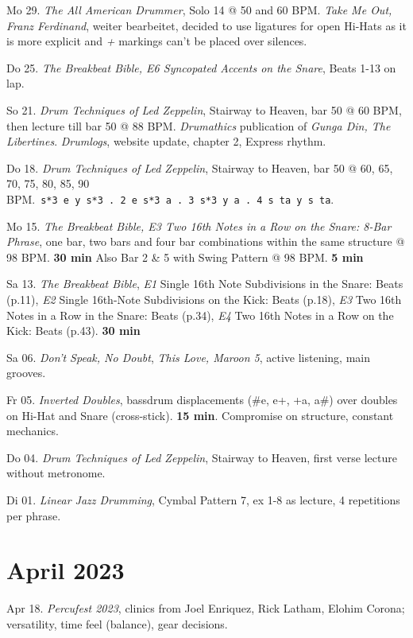 \documentclass[
]{book}
\begin{document}
Mo 29. \emph{The All American Drummer}, Solo 14 @ 50 and 60 BPM. \emph{Take Me Out, Franz Ferdinand}, weiter bearbeitet, decided to use ligatures for open Hi-Hats as it is more explicit and \emph{+} markings can't be placed over silences.

Do 25. \emph{The Breakbeat Bible, E6 Syncopated Accents on the Snare}, Beats 1-13 on lap.

So 21. \emph{Drum Techniques of Led Zeppelin}, Stairway to Heaven, bar 50 @ 60 BPM, then lecture till bar 50 @ 88 BPM. \emph{Drumathics} publication of \emph{Gunga Din, The Libertines}. \emph{Drumlogs}, website update, chapter 2, Express rhythm.

Do 18. \emph{Drum Techniques of Led Zeppelin}, Stairway to Heaven, bar 50 @ 60, 65, 70, 75, 80, 85, 90 BPM.~\texttt{s*3\ e\ y\ s*3\ .\ 2\ e\ s*3\ a\ .\ 3\ s*3\ y\ a\ .\ 4\ s\ ta\ y\ s\ ta}.

Mo 15. \emph{The Breakbeat Bible, E3 Two 16th Notes in a Row on the Snare: 8-Bar Phrase}, one bar, two bars and four bar combinations within the same structure @ 98 BPM. \textbf{30 min} Also Bar 2 \& 5 with Swing Pattern @ 98 BPM. \textbf{5 min}

Sa 13. \emph{The Breakbeat Bible}, \emph{E1} Single 16th Note Subdivisions in the Snare: Beats (p.11), \emph{E2} Single 16th-Note Subdivisions on the Kick: Beats (p.18), \emph{E3} Two 16th Notes in a Row in the Snare: Beats (p.34), \emph{E4} Two 16th Notes in a Row on the Kick: Beats (p.43). \textbf{30 min}

Sa 06. \emph{Don't Speak, No Doubt}, \emph{This Love, Maroon 5}, active listening, main grooves.

Fr 05. \emph{Inverted Doubles}, bassdrum displacements (\#e, e+, +a, a\#) over doubles on Hi-Hat and Snare (cross-stick). \textbf{15 min}. Compromise on structure, constant mechanics.

Do 04. \emph{Drum Techniques of Led Zeppelin}, Stairway to Heaven, first verse lecture without metronome.

Di 01. \emph{Linear Jazz Drumming}, Cymbal Pattern 7, ex 1-8 as lecture, 4 repetitions per phrase.

\hypertarget{april-2023}{%
\section*{April 2023}\label{april-2023}}

Apr 18. \emph{Percufest 2023}, clinics from Joel Enriquez, Rick Latham, Elohim Corona; versatility, time feel (balance), gear decisions.
\end{document}
